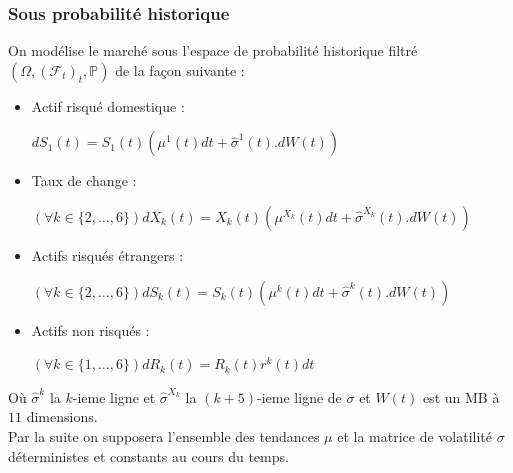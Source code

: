 \documentclass[a4paper,12pt]{article}
\begin{document}
\subsubsection{Sous probabilité historique}
On modélise le marché sous l'espace de probabilité historique filtré $(\Omega,(\mathcal{F}_t)_t,\mathbb{P})$ de la façon suivante : 
\begin{itemize}[label=$\star$]
\item Actif risqué domestique : \begin{center} $dS_1(t)=S_1(t)\left(\mu^1(t)dt+\widehat{\sigma}^1(t).dW(t)\right)$ \end{center}
\item Taux de change : \begin{center} $\left(\forall k \in \{2,\ldots,6\}\right)dX_k(t)=X_k(t)\left(\mu^{X_k}(t)dt+\widehat{\sigma}^{X_k}(t).dW(t)\right)$\end{center}
\item Actifs risqués étrangers : \begin{center} $\left(\forall k \in \{2,\ldots,6\}\right)dS_k(t)=S_k(t)\left(\mu^k(t)dt+\widehat{\sigma}^k(t).dW(t)\right)$\end{center}
\newpage
\item Actifs non risqués : \begin{center} $\left(\forall k \in \{1,\ldots,6\}\right) dR_k(t)=R_k(t)r^k(t)dt$\end{center}
\end{itemize}
Où $\widehat{\sigma}^k$ la $k$-ieme ligne et $\widehat{\sigma}^{X_k}$ la $(k+5)$-ieme ligne de $\sigma$ et $W(t)$ est un MB à $11$ dimensions.\\[2mm]
Par la suite on supposera l'ensemble des tendances $\mu$ et la matrice de volatilité $\sigma$ déterministes et constants au cours du temps.
\end{document}
